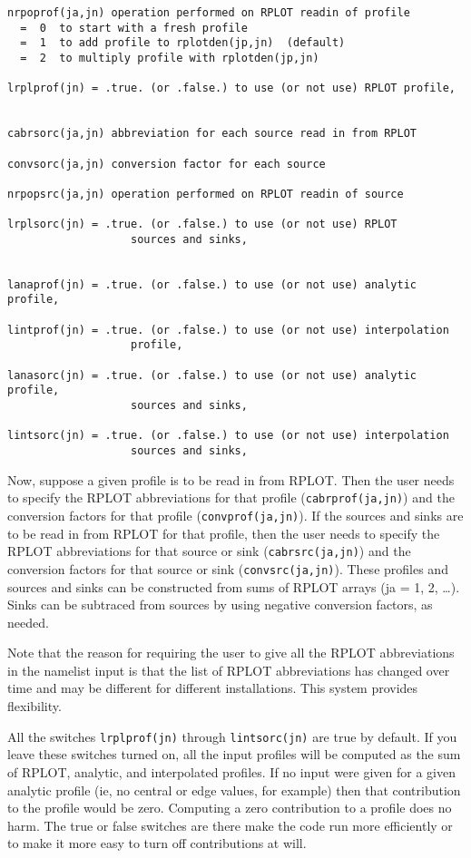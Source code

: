 \begin{verbatim}
nrpoprof(ja,jn) operation performed on RPLOT readin of profile
  =  0  to start with a fresh profile 
  =  1  to add profile to rplotden(jp,jn)  (default) 
  =  2  to multiply profile with rplotden(jp,jn)

lrplprof(jn) = .true. (or .false.) to use (or not use) RPLOT profile,


cabrsorc(ja,jn) abbreviation for each source read in from RPLOT

convsorc(ja,jn) conversion factor for each source

nrpopsrc(ja,jn) operation performed on RPLOT readin of source

lrplsorc(jn) = .true. (or .false.) to use (or not use) RPLOT
                   sources and sinks,


lanaprof(jn) = .true. (or .false.) to use (or not use) analytic profile,

lintprof(jn) = .true. (or .false.) to use (or not use) interpolation
                   profile,

lanasorc(jn) = .true. (or .false.) to use (or not use) analytic profile,
                   sources and sinks,

lintsorc(jn) = .true. (or .false.) to use (or not use) interpolation
                   sources and sinks,

\end{verbatim}

Now, suppose a given profile is to be read in from RPLOT.
Then the user needs to specify the RPLOT
abbreviations for that profile ({\tt cabrprof(ja,jn)}) and the
conversion factors for that profile ({\tt convprof(ja,jn)}).
If the sources and sinks are to be read in from RPLOT for that profile,
then the user needs to specify the RPLOT
abbreviations for that source or sink ({\tt cabrsrc(ja,jn)}) and the
conversion factors for that source or sink ({\tt convsrc(ja,jn)}).
These profiles and sources and sinks can be constructed from sums of
RPLOT arrays (ja = 1, 2, \ldots).
Sinks can be subtraced from sources by using negative conversion
factors, as needed.

Note that the reason for requiring the user to give all the RPLOT
abbreviations in the namelist input is that the list of RPLOT
abbreviations has changed over time and may be different for different
installations.  This system provides flexibility.

All the switches {\tt lrplprof(jn)} through {\tt lintsorc(jn)} are true
by default.  If you leave these switches turned on, all the input
profiles will be computed as the sum of RPLOT, analytic,
and interpolated profiles.  
If no input were given for a given analytic profile (ie, no central or
edge values, for example) then that contribution to the profile would
be zero.  Computing a zero contribution to a profile does no harm.
The true or false switches are there make the code run more efficiently
or to make it more easy to turn off contributions at will.




